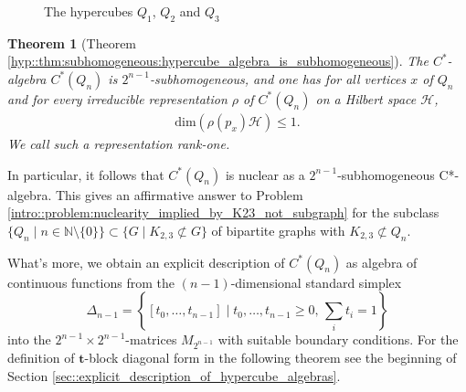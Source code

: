 \documentclass[a4paper]{amsart}
\newcommand{\N}{\mathbb{N}}
\newtheorem{introthm}{Theorem}
\begin{document}
\begin{figure}[htbp]
    \caption{The hypercubes $Q_1$, $Q_2$ and $Q_3$}
    \label{int::fig:hypercubes}
\end{figure}

\begin{introthm}[{Theorem \ref{hyp::thm:subhomogeneous:hypercube_algebra_is_subhomogeneous}}]
    The $C^\ast$-algebra $C^\ast(Q_n)$ is $2^{n-1}$-subhomogeneous, and one has for all vertices $x$ of $Q_n$ and for every irreducible representation $\rho$ of $C^\ast(Q_n)$ on a Hilbert space $\mathcal{H}$,
    \begin{align*}
        \mathrm{dim}(\rho(p_x) \mathcal{H}) \leq 1.
    \end{align*}
    We call such a representation \emph{rank-one}.
\end{introthm}

In particular, it follows that $C^\ast(Q_n)$ is nuclear as a $2^{n-1}$-subhomogeneous C*-algebra. This gives an affirmative answer to Problem \ref{intro::problem:nuclearity_implied_by_K23_not_subgraph} for the subclass $\{Q_n \mid n \in \N \setminus \{0\}\} \subset \{G \mid K_{2,3} \not \subset G\}$ of bipartite graphs with $K_{2,3} \not \subset Q_n$.

What's more, we obtain an explicit description of $C^\ast(Q_n)$ as algebra of continuous functions from the $(n-1)$-dimensional standard simplex 
$$
  \Delta_{n-1} = \left\{[t_0, \dots, t_{n-1}] \mid t_0, \dots, t_{n-1} \geq 0, \, \sum_i t_i = 1\right\}
$$ 
into the $2^{n-1} \times 2^{n-1}$-matrices $M_{2^{n-1}}$ with suitable boundary conditions. For the definition of $\mathbf{t}$-block diagonal form in the following theorem see the beginning of Section \ref{sec::explicit_description_of_hypercube_algebras}.
\end{document}
